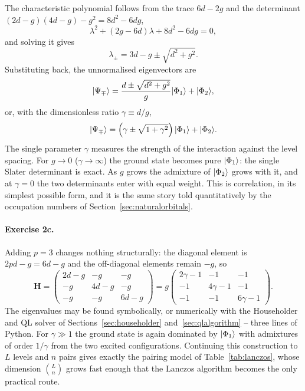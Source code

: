 The characteristic polynomial follows from the trace $6d-2g$ and the
determinant $(2d-g)(4d-g)-g^2=8d^2-6dg$,
\begin{equation}
  \lambda^2 + (2g-6d)\lambda + 8d^2 - 6dg = 0,
  \label{eq:2-w35charpoly}
\end{equation}
and solving it gives
\begin{equation}
  \lambda_{\pm} = 3d-g \pm \sqrt{d^2+g^2} .
  \label{eq:2-w35eigen}
\end{equation}
Substituting back, the unnormalised eigenvectors are
\begin{equation}
  \vert \Psi_{\mp} \rangle = \frac{d\pm\sqrt{d^2+g^2}}{g}\vert \Phi_1 \rangle
                    + \vert \Phi_2 \rangle,
  \label{eq:2-w35vec}
\end{equation}
or, with the dimensionless ratio $\gamma\equiv d/g$,
\begin{equation}
  \vert \Psi_{\mp} \rangle = \left(\gamma\pm\sqrt{1+\gamma^2}\right)\vert \Phi_1 \rangle
                    + \vert \Phi_2 \rangle .
  \label{eq:2-w35vecgamma}
\end{equation}
The single parameter $\gamma$ measures the strength of the interaction against
the level spacing.  For $g\rightarrow0$ ($\gamma\rightarrow\infty$) the ground
state becomes pure $\vert \Phi_1 \rangle$: the single Slater determinant is exact.
As $g$ grows the admixture of $\vert \Phi_2 \rangle$ grows with it, and at $\gamma=0$
the two determinants enter with equal weight.  This is correlation, in its
simplest possible form, and it is the same story told quantitatively by the
occupation numbers of Section~\ref{sec:naturalorbitals}.

\paragraph{Exercise 2c.}
Adding $p=3$ changes nothing structurally: the diagonal element is
$2pd-g=6d-g$ and the off-diagonal elements remain $-g$, so
\begin{equation}
  \bm{H} =
  \begin{pmatrix}
    2d-g & -g   & -g\\
    -g   & 4d-g & -g\\
    -g   & -g   & 6d-g
  \end{pmatrix}
   = g\begin{pmatrix}
    2\gamma-1 & -1 & -1\\
    -1 & 4\gamma-1 & -1\\
    -1 & -1 & 6\gamma-1
  \end{pmatrix}.
  \label{eq:2-w35hmat3}
\end{equation}
The eigenvalues may be found symbolically, or numerically with the Householder
and QL solver of Sections~\ref{sec:householder} and~\ref{sec:qlalgorithm} --
three lines of Python.  For $\gamma\gg1$ the ground state is again dominated
by $\vert \Phi_1 \rangle$ with admixtures of order $1/\gamma$ from the two excited
configurations.  Continuing this construction to $L$ levels and $n$ pairs
gives exactly the pairing model of Table~\ref{tab:lanczos}, whose dimension
$\binom{L}{n}$ grows fast enough that the Lanczos algorithm becomes the only
practical route.

